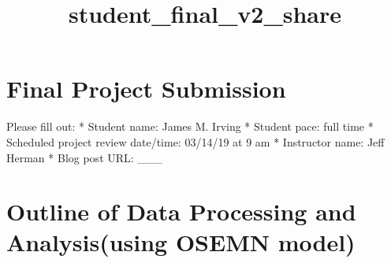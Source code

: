\documentclass[11pt]{article}
\title{student\_final\_v2\_share}
\begin{document}
    
    
    \maketitle
    
    

    
    \hypertarget{final-project-submission}{%
\section{Final Project Submission}\label{final-project-submission}}

Please fill out: * Student name: James M. Irving * Student pace: full
time * Scheduled project review date/time: 03/14/19 at 9 am * Instructor
name: Jeff Herman * Blog post URL: \_\_\_

    \hypertarget{outline-of-data-processing-and-analysisusing-osemn-model}{%
\section{Outline of Data Processing and Analysis(using OSEMN
model)}\label{outline-of-data-processing-and-analysisusing-osemn-model}}
\end{document}
